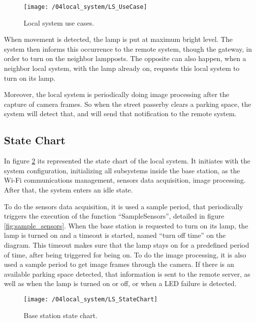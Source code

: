 \begin{figure}[ht] 
	\centering
	\texttt{[image: /04local\_system/LS\_UseCase]}
	\caption{Local system use cases.}
	\label{fig:ls_use_cases}
\end{figure}

When movement is detected, the lamp is put at maximum bright level. The system then informs this occurrence to the remote system, though the gateway, in order to turn on the neighbor lampposts. The opposite can also happen, when a neighbor local system, with the lamp already on, requests this local system to turn on its lamp. 

Moreover, the local system is periodically doing image processing after the capture of camera frames. So when the street passerby clears a parking space, the system will detect that, and will send that notification to the remote system.

\subsection{State Chart}
In figure \ref{fig:ls_state_chart} its represented the state chart of the local system. It initiates with the system configuration, initializing all subsystems inside the base station, as the Wi-Fi communications management, sensors data acquisition, image processing. After that, the system enters an idle state.

To do the sensors data acquisition, it is used a sample period, that periodically triggers the execution of the function “SampleSensors”, detailed in figure \ref{fig:sample_sensors}. When the base station is requested to turn on its lamp, the lamp is turned on and a timeout is started, named “turn off time” on the diagram. This timeout makes sure that the lamp stays on for a predefined period of time, after being triggered for being on. To do the image processing, it is also used a sample period to get image frames through the camera. If there is an available parking space detected, that information is sent to the remote server, as well as when the lamp is turned on or off, or when a LED failure is detected.

\begin{figure}[ht]
	\centering
	\texttt{[image: /04local\_system/LS\_StateChart]}
	\caption{Base station state chart.}
	\label{fig:ls_state_chart}
\end{figure}

